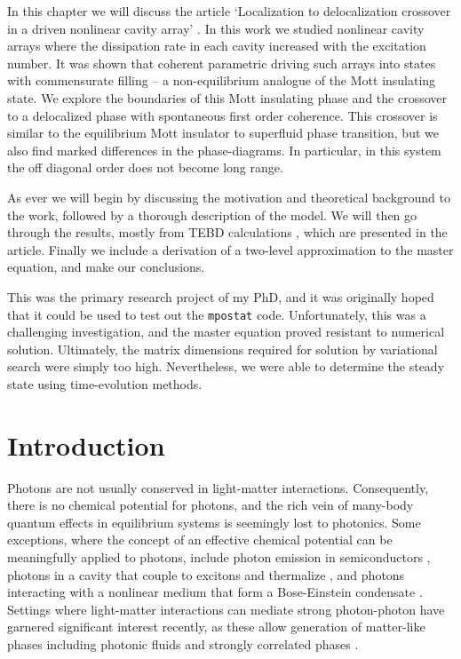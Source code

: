 In this chapter we will discuss the article `Localization to delocalization crossover in a driven nonlinear cavity array' \cite{Brown2018}. In this work we studied nonlinear cavity arrays where the dissipation rate in each cavity increased with the excitation number. It was shown that coherent parametric driving such arrays into states with commensurate filling -- a non-equilibrium analogue of the Mott insulating state. We explore the boundaries of this Mott insulating phase and the crossover to a delocalized phase with spontaneous first order coherence. This crossover is similar to the equilibrium Mott insulator to superfluid phase transition, but we also find marked differences in the phase-diagrams. In particular, in this system the off diagonal order does not become long range.  

As ever we will begin by discussing the motivation and theoretical background to the work, followed by a thorough description of the model. We will then go through the results, mostly from TEBD calculations \cite{Vidal2003}, which are presented in the article. Finally we include a derivation of a two-level approximation to the master equation, and make our conclusions.

This was the primary research project of my PhD, and it was originally hoped that it could be used to test out the \lstinline$mpostat$ code. Unfortunately, this was a challenging investigation, and the master equation proved resistant to numerical solution. Ultimately, the matrix dimensions required for solution by variational search were simply too high. Nevertheless, we were able to determine the steady state using time-evolution methods. 

\section{Introduction}

Photons are not usually conserved in light-matter interactions. Consequently, there is no chemical potential for photons, and the rich vein of many-body quantum effects in equilibrium systems is seemingly lost to photonics. Some exceptions, where the concept of an effective chemical potential can be meaningfully applied to photons, include photon emission in semiconductors \cite{Wurfel1982}, photons in a cavity that couple to excitons and thermalize \cite{Keeling2007,Eastham2001,Carusotto2013}, and photons interacting with a nonlinear medium that form a Bose-Einstein condensate \cite{Kasprzak2006,Klaers2010}. Settings where light-matter interactions can mediate strong photon-photon have garnered significant interest recently, as these allow generation of matter-like phases including photonic fluids \cite{Carusotto2013,Vocke2015} and strongly correlated phases \cite{Hartmann2008,Hartmann2016,Noh2017}.

